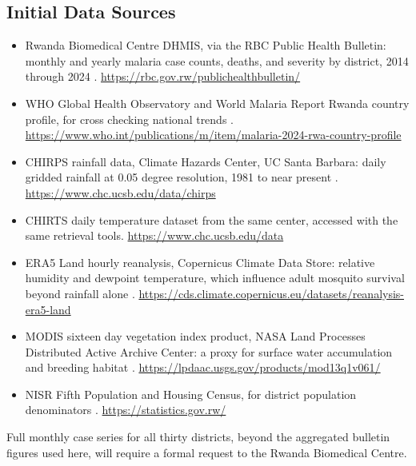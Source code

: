 \documentclass[11pt]{article}
\begin{document}
\subsection{Initial Data Sources}
\begin{itemize}
\item Rwanda Biomedical Centre DHMIS, via the RBC Public Health Bulletin: monthly and yearly malaria case counts, deaths, and severity by district, 2014 through 2024 \cite{rbc2024}. \url{https://rbc.gov.rw/publichealthbulletin/}
\item WHO Global Health Observatory and World Malaria Report Rwanda country profile, for cross checking national trends \cite{who2024}. \url{https://www.who.int/publications/m/item/malaria-2024-rwa-country-profile}
\item CHIRPS rainfall data, Climate Hazards Center, UC Santa Barbara: daily gridded rainfall at 0.05 degree resolution, 1981 to near present \cite{funk2015}. \url{https://www.chc.ucsb.edu/data/chirps}
\item CHIRTS daily temperature dataset from the same center, accessed with the same retrieval tools. \url{https://www.chc.ucsb.edu/data}
\item ERA5 Land hourly reanalysis, Copernicus Climate Data Store: relative humidity and dewpoint temperature, which influence adult mosquito survival beyond rainfall alone \cite{munozsabater2021}. \url{https://cds.climate.copernicus.eu/datasets/reanalysis-era5-land}
\item MODIS sixteen day vegetation index product, NASA Land Processes Distributed Active Archive Center: a proxy for surface water accumulation and breeding habitat \cite{didan2020}. \url{https://lpdaac.usgs.gov/products/mod13q1v061/}
\item NISR Fifth Population and Housing Census, for district population denominators \cite{nisr2022}. \url{https://statistics.gov.rw/}
\end{itemize}
Full monthly case series for all thirty districts, beyond the aggregated bulletin figures used here, will require a formal request to the Rwanda Biomedical Centre.
\end{document}
